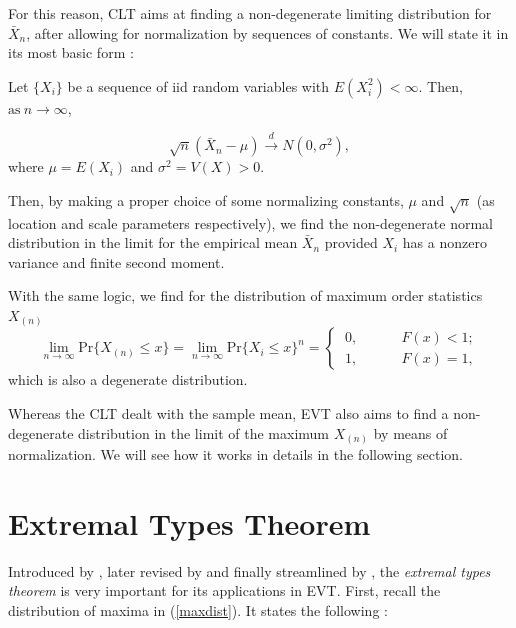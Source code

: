 For this reason, CLT aims at finding a non-degenerate limiting distribution for $\bar{X}_n$, after allowing for normalization by sequences of constants. We will state it in its most basic form :

\begin{exe} 
	Let $\{X_i\}$ be a sequence of iid random variables with $E(X^2_i)<\infty$. Then, $\text{as} \ n\rightarrow\infty$,
	
	\begin{equation*}
	\sqrt{n}(\bar{X}_n-\mu)\stackrel{d}{\longrightarrow}N(0,\sigma^2),
	\end{equation*}
	where $\mu=E(X_i)$ and $\sigma^2=V(X)>0$.
\end{exe}

Then, by making a proper choice of some normalizing constants, $\mu$ and $\sqrt{n}$ (as location and scale parameters respectively), we find the non-degenerate normal distribution in the limit for the empirical mean $\bar{X}_n$ provided $X_i$ has a nonzero variance and finite second moment. 

With the same logic, we find for the distribution of maximum order statistics $X_{(n)}$ 
\begin{equation}
\displaystyle{\lim_{n \to \infty}}\text{Pr}\big\{X_{(n)}\leq x\big\}=\displaystyle{\lim_{n \to \infty}}\text{Pr}\big\{X_i\leq x\big\}^n=\begin{cases}
\ 0, \ \ \ \ \ \ \ \ \ \ \  \ \ \ F(x)<1; \\ 
\ 1, \ \ \ \ \ \ \ \ \ \ \ \  \ \ F(x)=1,
\end{cases}
\end{equation}
which is also a degenerate distribution.

Whereas the CLT dealt with the sample mean, EVT also aims to find a non-degenerate distribution in the limit of the maximum $X_{(n)}$ by means of normalization. We will see how it works in details in the following section.


\section{Extremal Types Theorem}\label{sec:extrtypethm}


Introduced by \cite{fisher_limiting_1928}, later revised by \cite{gnedenko_sur_1943} and finally streamlined by \cite{de_haan_regular_1970}, the \emph{extremal types theorem} is very important for its applications in EVT. First, recall the distribution of maxima in (\ref{maxdist}). It states the following :  


